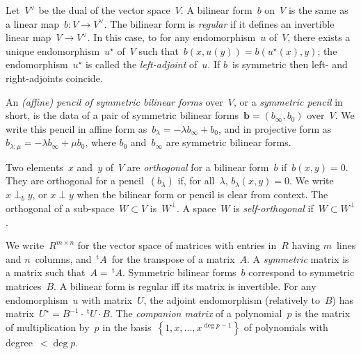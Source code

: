 \documentclass{lms}%
\def\transpose{\,{}^{\mathrm{t}\!}}
\def\acco#1{\left\{#1\right\}}
\begin{document}
Let~$V^{∨}$ be the dual of the vector space~$V$. A bilinear form~$b$
on~$V$ is the same as a linear map~$b: V → V^{∨}$. The bilinear form is
\emph{regular} if it defines an invertible linear map~$V → V^{∨}$. In
this case, to for any endomorphism~$u$ of~$V$, there exists a unique
endomorphism~$u^{⋆}$ of~$V$ such that~$b(x,u(y)) = b(u^{⋆}(x), y)$; the
endomorphism~$u^{⋆}$ is called the \emph{left-adjoint} of~$u$. If $b$~is
symmetric then left- and right-adjoints coincide.

An \emph{(affine) pencil of symmetric bilinear
forms} over~$V$, or a \emph{symmetric pencil} in short, is the data of a
pair of symmetric bilinear forms~$\bm{b} = (b_{∞}, b_{0})$ over~$V$. We
write this pencil in affine form as~$b_{λ} = -λ b_{∞} + b_{0}$, and in
projective form as~$b_{λ:μ} = -λ b_{∞} + μ b_{0}$, where $b_{0}$
and~$b_{∞}$ are symmetric bilinear forms.

Two elements~$x$ and~$y$ of~$V$ are \emph{orthogonal} for a
bilinear form~$b$ if~$b(x,y) = 0$. They are orthogonal
for a pencil~$(b_{λ})$ if, for all~$λ$, $b_{λ}(x,y) = 0$. We write~$x
⟂_{b} y$, or $x ⟂ y$ when the bilinear form or pencil is clear from
context. The orthogonal of a sub-space~$W ⊂ V$ is~$W^{⟂}$. A space~$W$
is \emph{self-orthogonal} if~$W ⊂ W^{⟂}$.

\medbreak

We write~$R^{m×n}$ for the vector space of matrices with entries in~$R$
having $m$~lines and $n$~columns, and $\transpose{A}$~for the transpose
of a matrix~$A$. A \emph{symmetric} matrix is a matrix such that~$A =
\transpose{A}$. Symmetric bilinear forms~$b$ correspond to symmetric
matrices~$B$. A bilinear form is regular iff its matrix is invertible.
For any endomorphism~$u$ with matrix~$U$, the adjoint endomorphism
(relatively to~$B$) has matrix~$U^{⋆} = B^{-1} · \transpose{U} · B$. The
\emph{companion matrix} of a polynomial~$p$ is the matrix of
multiplication by~$p$ in the basis~$\acco{1,x,…,x^{\deg p-1}}$ of
polynomials with degree~$< \deg p$.

\end{document}
